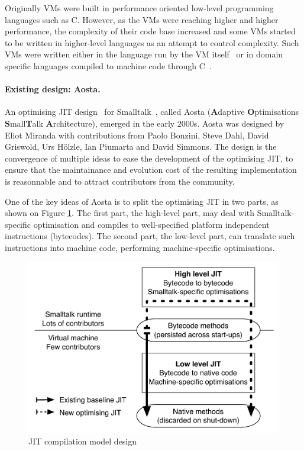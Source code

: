 \documentclass[a4paper,12pt,twoside]{../includes/ThesisStyle}
\begin{document}
Originally VMs were built in performance oriented low-level programming languages such as C. However, as the VMs were reaching higher and higher performance, the complexity of their code base increased and some VMs started to be written in higher-level languages as an attempt to control complexity. Such VMs were written either in the language run by the VM itself~\cite{Unga05b,Wimm13a,Alp99a} or in domain specific languages compiled to machine code through C~\cite{Rigo06a,Inga97a}.

\paragraph{Existing design: Aosta.}

An optimising JIT design~\cite{Mira02c} for Smalltalk~\cite{Gold83a}, called Aosta (\textbf{A}daptive \textbf{O}ptimisations \textbf{S}mall\textbf{T}alk \textbf{A}rchitecture), emerged in the early 2000s. Aosta was designed by Eliot Miranda with contributions from Paolo Bonzini, Steve Dahl, David Griswold, Urs H\"olzle, Ian Piumarta and David Simmons. The design is the convergence of multiple ideas to ease the development of the optimising JIT, to ensure that the maintainance and evolution cost of the resulting implementation is reasonnable and to attract contributors from the community.

One of the key ideas of Aosta is to split the optimising JIT in two parts, as shown on Figure \ref{fig:ExistingDesign}. The first part, the high-level part, may deal with Smalltalk-specific optimisation and compiles to well-specified platform independent instructions (bytecodes). The second part, the low-level part, can translate such instructions into machine code, performing machine-specific optimisations.

\begin{figure}[h!]
    \begin{center}
        \includegraphics[width=0.8\linewidth]{ExistingDesign}
        \caption{JIT compilation model design}
        \label{fig:ExistingDesign}
    \end{center}
\end{figure}
\end{document}
